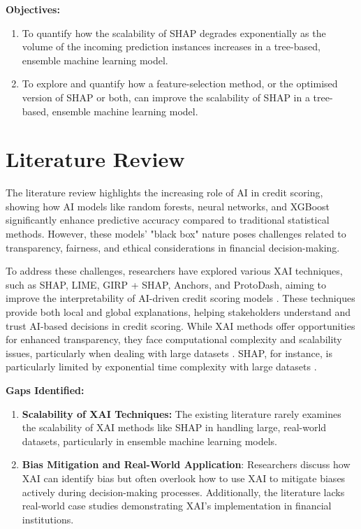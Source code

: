 \documentclass[12pt,a4paper]{article}
\begin{document}
\textbf{Objectives:}\\
\vspace{-3em}
\begin{enumerate}
    \item To quantify how the scalability of SHAP degrades exponentially as the volume of the incoming prediction instances increases in a tree-based, ensemble machine learning model.
    \item To explore and quantify how a feature-selection method, or the optimised version of SHAP or both, can improve the scalability of SHAP in a tree-based, ensemble machine learning model.
\end{enumerate}





\section{Literature Review}
\vspace{-1em}
The literature review highlights the increasing role of AI in credit scoring, showing how AI models like random forests, neural networks, and XGBoost significantly enhance predictive accuracy compared to traditional statistical methods. However, these models’ "black box" nature poses challenges related to transparency, fairness, and ethical considerations in financial decision-making.

To address these challenges, researchers have explored various XAI techniques, such as SHAP, LIME, GIRP + SHAP, Anchors, and ProtoDash, aiming to improve the interpretability of AI-driven credit scoring models \citep{demajo2020explainable}. These techniques provide both local and global explanations, helping stakeholders understand and trust AI-based decisions in credit scoring. While XAI methods offer opportunities for enhanced transparency, they face computational complexity and scalability issues, particularly when dealing with large datasets \cite{demajo2020explainable}. SHAP, for instance, is particularly limited by exponential time complexity with large datasets \citep{misheva2021explainable}.

\textbf{Gaps Identified:}\\
\vspace{-3em}
\begin{enumerate}
    \item \textbf{Scalability of XAI Techniques:} The existing literature rarely examines the scalability of XAI methods like SHAP in handling large, real-world datasets, particularly in ensemble machine learning models.
    \item \textbf{Bias Mitigation and Real-World Application}: Researchers discuss how XAI can identify bias but often overlook how to use XAI to mitigate biases actively during decision-making processes. Additionally, the literature lacks real-world case studies demonstrating XAI's implementation in financial institutions.
\end{enumerate}
\end{document}
